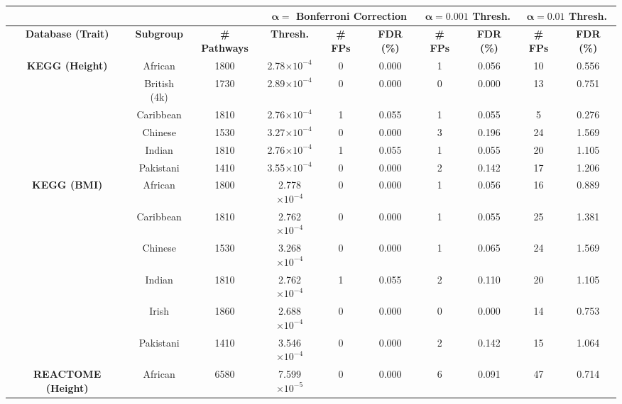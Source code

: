\documentclass[10pt]{article}
\begin{document}
\begin{landscape}

\setlength{\extrarowheight}{3pt}

\begin{table}[ht]
\centering
\vspace*{-1.5cm}
\hspace*{-2em}
\begin{tabular}{|c|c|c|ccc|cc|cc|}
  \hline
& & & \multicolumn{3}{c|}{\textbf{$\bm{\alpha =}$ Bonferroni Correction}} & \multicolumn{2}{c|}{\textbf{$\bm{\alpha = 0.001}$ Thresh.}} & \multicolumn{2}{c|}{\textbf{$\bm{\alpha = 0.01}$ Thresh.}}\\
\hline
\textbf{Database (Trait)} & \textbf{Subgroup} & \textbf{\# Pathways} & \textbf{Thresh.} & \textbf{\# FPs} & \textbf{FDR (\%)} & \textbf{\# FPs} & \textbf{FDR (\%)} &  \textbf{\# FPs} & \textbf{FDR (\%)} \\ 
  \hline
\multirow{6.5}{*}{\textbf{KEGG (Height)}} & African & 1800 & 2.78$\times10^{-4}$ & 0 & 0.000  & 1 & 0.056 & 10 & 0.556 \\ 
  & British (4k) & 1730 & 2.89$\times10^{-4}$ & 0 & 0.000 & 0 & 0.000 & 13 & 0.751 \\ 
  & Caribbean & 1810 & 2.76$\times10^{-4}$ & 1 & 0.055 & 1 & 0.055 & 5 & 0.276 \\ 
  & Chinese & 1530 & 3.27$\times10^{-4}$ & 0 & 0.000 & 3 & 0.196 & 24 & 1.569 \\ 
  & Indian & 1810 & 2.76$\times10^{-4}$ & 1 & 0.055 & 1 & 0.055 & 20 & 1.105 \\ 
  & Pakistani & 1410 & 3.55$\times10^{-4}$ & 0 & 0.000 & 2 & 0.142 & 17 & 1.206 \\ 
  \hline
\multirow{6.5}{*}{\textbf{KEGG (BMI)}} & African & 1800 & 2.778$\times10^{-4}$ & 0 & 0.000 & 1 & 0.056 & 16 & 0.889 \\
 & Caribbean & 1810 & 2.762$\times10^{-4}$ & 0 & 0.000 & 1 & 0.055 & 25 & 1.381 \\ 
 & Chinese & 1530 & 3.268$\times10^{-4}$ & 0 & 0.000 & 1 & 0.065 & 24 & 1.569 \\ 
 & Indian & 1810 & 2.762$\times10^{-4}$ & 1 & 0.055 & 2 & 0.110 & 20 & 1.105 \\ 
 & Irish & 1860 & 2.688$\times10^{-4}$ & 0 & 0.000 & 0 & 0.000 & 14 & 0.753 \\ 
 & Pakistani & 1410 & 3.546$\times10^{-4}$ & 0 & 0.000 & 2 & 0.142 & 15 & 1.064 \\ 
  \hline
\multirow{6.5}{*}{\textbf{REACTOME (Height)}} & African & 6580 & 7.599$\times10^{-5}$ & 0 & 0.000 & 6 & 0.091 & 47 & 0.714 \\ 

\end{tabular}
\end{table}
\end{landscape}
\end{document}
